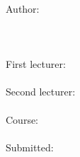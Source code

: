 \begin{titlepage}

    \begin{figure}
        \hfill
        \subfigure{\documentLogo}
    \end{figure}
    \begin{center}
        \documentType\\
        \Huge\documentTitle\normalsize\\
 \Large\documentSubTitle\normalsize\\
        Author:\\
        \documentAuthor\\
        \documentAuthorStreet\\
        \documentAuthorPostalcode \documentAuthorCity\\
        First lecturer:\\
        \documentFirstValidator\\
        Second lecturer:\\
        \documentSecondValidator\\
        Course:\\
        \documentUniCourse\\
        Submitted:\\
        \documentDate\\
    \end{center}
\end{titlepage}

\tableofcontents

\listoffigures
{}
